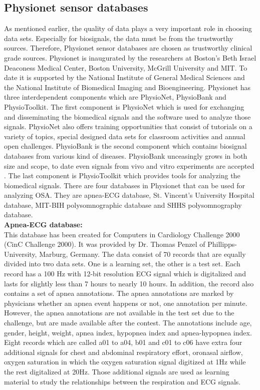    \subsection{Physionet sensor databases}
        As mentioned earlier, the quality of data plays a very important role in choosing data sets. Especially for biosignals, the data must be from the trustworthy sources. Therefore, Physionet sensor databases are chosen as trustworthy clinical grade sources. Physionet is inaugurated by the researchers at Boston's Beth Israel Deaconess Medical Center, Boston University, McGrill University and MIT\cite{PhysioNet_Intro}. To date it is supported by the National Institute of General Medical Sciences and the National Institute of Biomedical Imaging and Bioengineering. Physionet has three interdependent components which are PhysioNet, PhysioBank and PhysioToolkit. The first component is PhysioNet which is used for exchanging and disseminating the biomedical signals and the software used to analyze those signals. PhysioNet also offers training opportunities\cite{PhysioNet_Training} that consist of tutorials on a variety of topics, special designed data sets for classroom activities and annual open challenges. PhysioBank is the second component which contains biosignal databases from various kind of diseases. PhysioBank unceasingly grows in both size and scope, to date even signals from vivo and vitro experiments are accepted \cite{PhysioNet_Contributing}. The last component is PhysioToolkit which provides tools for analyzing the biomedical signals. There are four databases in Physionet that can be used for analyzing OSA. They are apnea-ECG database, St. Vincent's University Hospital database, MIT-BIH polysomnographic database and SHHS polysomnography database.\\
        \textbf{Apnea-ECG database\cite{Apnea_ecg_db}: }\\
        This database has been created for Computers in Cardiology Challenge 2000 (CinC Challenge 2000). It was provided by Dr. Thomas Penzel of Phillipps-University, Marburg, Germany\cite{CinC2000}. The data consist of 70 records that are equally divided into two data sets. One is a learning set, the other is a test set. Each record has a 100 Hz with 12-bit resolution ECG signal which is digitalized and lasts for slightly less than 7 hours to nearly 10 hours. In addition, the record also contains a set of apnea annotations. The apnea annotations are marked by physicians whether an apnea event happens or not, one annotation per minute. However, the apnea annotations are not available in the test set due to the challenge, but are made available after the contest. The annotations include age, gender, height, weight, apnea index, hypopnea index and apnea-hypopnea index. Eight records which are called a01 to a04, b01 and c01 to c06 have extra four additional signals\cite{Apnea_ecg} for chest and abdominal respiratory effort, oronasal airflow, oxygen saturation in which the oxygen saturation signal digitized at 1Hz while the rest digitalized at 20Hz. Those additional signals are used as learning material to study the relationships between the respiration and ECG signals.\\
